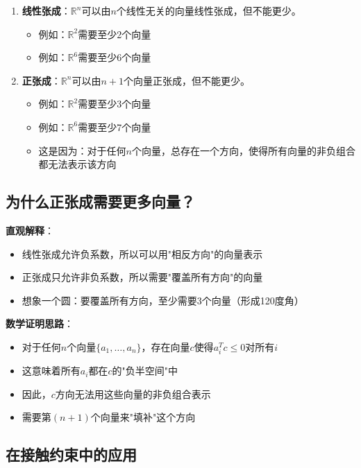 \documentclass[12pt,a4paper]{article}
\begin{document}
\begin{enumerate}
\item \textbf{线性张成}：$\mathbb{R}^n$可以由$n$个线性无关的向量线性张成，但不能更少。
  \begin{itemize}
  \item 例如：$\mathbb{R}^2$需要至少2个向量
  \item 例如：$\mathbb{R}^6$需要至少6个向量
  \end{itemize}

\item \textbf{正张成}：$\mathbb{R}^n$可以由$n + 1$个向量正张成，但不能更少。
  \begin{itemize}
  \item 例如：$\mathbb{R}^2$需要至少3个向量
  \item 例如：$\mathbb{R}^6$需要至少7个向量
  \item 这是因为：对于任何$n$个向量，总存在一个方向，使得所有向量的非负组合都无法表示该方向
  \end{itemize}
\end{enumerate}

\subsection{为什么正张成需要更多向量？}

\textbf{直观解释}：
\begin{itemize}
\item 线性张成允许负系数，所以可以用"相反方向"的向量表示
\item 正张成只允许非负系数，所以需要"覆盖所有方向"的向量
\item 想象一个圆：要覆盖所有方向，至少需要3个向量（形成120度角）
\end{itemize}

\textbf{数学证明思路}：
\begin{itemize}
\item 对于任何$n$个向量$\{a_1, \ldots, a_n\}$，存在向量$c$使得$a_i^T c \leq 0$对所有$i$
\item 这意味着所有$a_i$都在$c$的"负半空间"中
\item 因此，$c$方向无法用这些向量的非负组合表示
\item 需要第$(n+1)$个向量来"填补"这个方向
\end{itemize}

\subsection{在接触约束中的应用}
\end{document}
